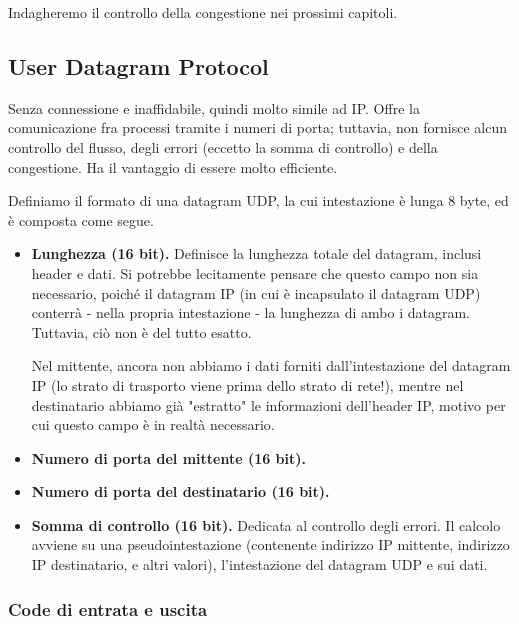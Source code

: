             Indagheremo il controllo della congestione nei prossimi capitoli.
            
    \subsection{User Datagram Protocol}
    
        Senza connessione e inaffidabile, quindi molto simile ad IP. Offre la comunicazione fra processi tramite i numeri di porta; tuttavia, non fornisce alcun controllo del flusso, degli errori (eccetto la somma di controllo) e della congestione. Ha il vantaggio di essere molto efficiente.
        
        Definiamo il formato di una datagram UDP, la cui intestazione è lunga 8 byte, ed è composta come segue.
        
        \begin{itemize}
            \item
                \textbf{Lunghezza (16 bit).} Definisce la lunghezza totale del datagram, inclusi header e dati. Si potrebbe lecitamente pensare che questo campo non sia necessario, poiché il datagram IP (in cui è incapsulato il datagram UDP) conterrà - nella propria intestazione - la lunghezza di ambo i datagram. Tuttavia, ciò non è del tutto esatto.
                
                Nel mittente, ancora non abbiamo i dati forniti dall'intestazione del datagram IP (lo strato di trasporto viene prima dello strato di rete!), mentre nel destinatario abbiamo già "estratto" le informazioni dell'header IP, motivo per cui questo campo è in realtà necessario.
                
            \item
                \textbf{Numero di porta del mittente (16 bit).}
                
            \item
               \textbf{Numero di porta del destinatario (16 bit).}
                
            \item
                \textbf{Somma di controllo (16 bit).} Dedicata al controllo degli errori. Il calcolo avviene su una pseudointestazione (contenente indirizzo IP mittente, indirizzo IP destinatario, e altri valori), l'intestazione del datagram UDP e sui dati.
        \end{itemize}
        
        \subsubsection{Code di entrata e uscita}
        

